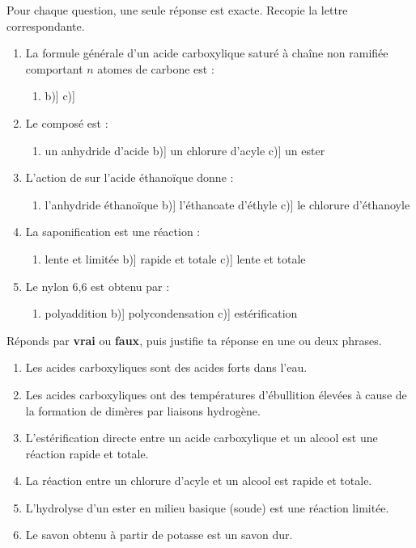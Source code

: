 \documentclass[11pt]{article}
\begin{document}
\begin{exercice}
Pour chaque question, une seule réponse est exacte. Recopie la lettre correspondante.
\begin{enumerate}
\item La formule générale d'un acide carboxylique saturé à chaîne non ramifiée comportant $n$ atomes de carbone est :
\begin{enumerate}
\item[a)]  \quad b)]  \quad c)] 
\end{enumerate}
\item Le composé  est :
\begin{enumerate}
\item[a)] un anhydride d'acide \quad b)] un chlorure d'acyle \quad c)] un ester
\end{enumerate}
\item L'action de  sur l'acide éthanoïque donne :
\begin{enumerate}
\item[a)] l'anhydride éthanoïque \quad b)] l'éthanoate d'éthyle \quad c)] le chlorure d'éthanoyle
\end{enumerate}
\item La saponification est une réaction :
\begin{enumerate}
\item[a)] lente et limitée \quad b)] rapide et totale \quad c)] lente et totale
\end{enumerate}
\item Le nylon 6,6 est obtenu par :
\begin{enumerate}
\item[a)] polyaddition \quad b)] polycondensation \quad c)] estérification
\end{enumerate}
\end{enumerate}
\end{exercice}

\begin{exercice}
Réponds par \textbf{vrai} ou \textbf{faux}, puis justifie ta réponse en une ou deux phrases.
\begin{enumerate}
\item Les acides carboxyliques sont des acides forts dans l'eau.
\item Les acides carboxyliques ont des températures d'ébullition élevées à cause de la formation de dimères par liaisons hydrogène.
\item L'estérification directe entre un acide carboxylique et un alcool est une réaction rapide et totale.
\item La réaction entre un chlorure d'acyle et un alcool est rapide et totale.
\item L'hydrolyse d'un ester en milieu basique (soude) est une réaction limitée.
\item Le savon obtenu à partir de potasse  est un savon dur.
\end{enumerate}
\end{exercice}
\end{document}
